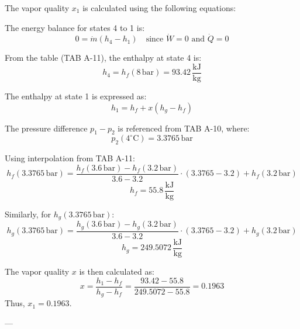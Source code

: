 The vapor quality \( x_1 \) is calculated using the following equations:  

The energy balance for states 4 to 1 is:  
\[
0 = \dot{m}(h_4 - h_1) \quad \text{since } \dot{W} = 0 \text{ and } \dot{Q} = 0
\]  

From the table (TAB A-11), the enthalpy at state 4 is:  
\[
h_4 = h_f(8 \, \text{bar}) = 93.42 \, \frac{\text{kJ}}{\text{kg}}
\]  

The enthalpy at state 1 is expressed as:  
\[
h_1 = h_f + x(h_g - h_f)
\]  

The pressure difference \( p_1 - p_2 \) is referenced from TAB A-10, where:  
\[
p_2(4^\circ\text{C}) = 3.3765 \, \text{bar}
\]  

Using interpolation from TAB A-11:  
\[
h_f(3.3765 \, \text{bar}) = \frac{h_f(3.6 \, \text{bar}) - h_f(3.2 \, \text{bar})}{3.6 - 3.2} \cdot (3.3765 - 3.2) + h_f(3.2 \, \text{bar})
\]  
\[
h_f = 55.8 \, \frac{\text{kJ}}{\text{kg}}
\]  

Similarly, for \( h_g(3.3765 \, \text{bar}) \):  
\[
h_g(3.3765 \, \text{bar}) = \frac{h_g(3.6 \, \text{bar}) - h_g(3.2 \, \text{bar})}{3.6 - 3.2} \cdot (3.3765 - 3.2) + h_g(3.2 \, \text{bar})
\]  
\[
h_g = 249.5072 \, \frac{\text{kJ}}{\text{kg}}
\]  

The vapor quality \( x \) is then calculated as:  
\[
x = \frac{h_1 - h_f}{h_g - h_f} = \frac{93.42 - 55.8}{249.5072 - 55.8} = 0.1963
\]  
Thus, \( x_1 = 0.1963 \).  

---